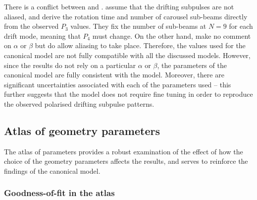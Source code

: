 There is a conflict between \citet{SMS+2007} and \citet{MBW+2019}. \citet{SMS+2007} assume that the drifting subpulses are not aliased, and derive the rotation time and number of carousel sub-beams directly from the observed $P_3$ values. They fix the number of sub-beams at $N=9$ for each drift mode, meaning that $P_4$ must change. On the other hand, \citet{MBW+2019} make no comment on $\alpha$ or $\beta$ but do allow aliasing to take place. Therefore, the values used for the canonical model are not fully compatible with all the discussed models. However, since the \citet{MBW+2019} results do not rely on a particular $\alpha$ or $\beta$, the parameters of the canonical model are fully consistent with the \citet{MBW+2019} model. Moreover, there are significant uncertainties associated with each of the parameters used -- this further suggests that the model does not require fine tuning in order to reproduce the observed polarised drifting subpulse patterns.





\subsection{Atlas of geometry parameters}
\label{sec: B0031 - discuss - atlas}

The atlas of parameters provides a robust examination of the effect of how the choice of the geometry parameters affects the results, and serves to reinforce the findings of the canonical model.

\subsubsection{Goodness-of-fit in the atlas}
\label{sec: B0031 - discuss - atlas - chi2}

